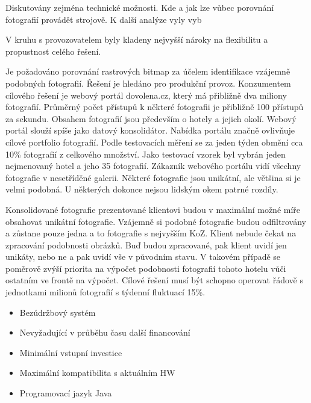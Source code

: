 Diskutovány zejména technické možnosti. Kde a jak lze vůbec porovnání fotografií provádět strojově. K další analýze vyly vyb

V kruhu s provozovatelem byly kladeny nejvyšší nároky na flexibilitu a propustnost celého řešení.


Je požadováno porovnání rastrových bitmap za účelem identifikace vzájemně podobných fotografií. Řešení je hledáno pro produkční provoz. Konzumentem cílového řešení je webový portál dovolena.cz, který má přibližně dva miliony fotografií. Průměrný počet přístupů k některé fotografii je přibližně 100 přístupů za sekundu. Obsahem fotografií jsou především o hotely a jejich okolí. Webový portál slouží spíše jako datový konsolidátor. Nabídka portálu značně ovlivňuje cílové portfolio fotografií. Podle testovacích měření se za jeden týden obmění cca 10\% fotografií z celkového množství. Jako testovací vzorek byl vybrán jeden nejmenovaný hotel a jeho 35 fotografií. Zákazník webového portálu vidí všechny fotografie v nesetříděné galerii. Některé fotografie jsou unikátní, ale většina si je velmi podobná. U některých dokonce nejsou lidským okem patrné rozdíly.

Konsolidované fotografie prezentované klientovi budou v maximální možné míře obsahovat unikátní fotografie. Vzájemně si podobné fotografie budou odfiltrovány a zůstane pouze jedna a to fotografie s nejvyšším KoZ. Klient nebude čekat na zpracování podobnosti obrázků. Buď budou zpracované, pak klient uvidí jen unikáty, nebo ne a pak uvidí vše v původním stavu. V takovém případě se poměrově zvýší priorita na výpočet podobnosti fotografií tohoto hotelu vůči ostatním ve frontě na výpočet. Cílové řešení musí být schopno operovat řádově s jednotkami milionů fotografií s týdenní fluktuací 15\%.

\begin{itemize}
	\setlength{\parskip}{0pt}
	\setlength{\itemsep}{0pt}
	\item {Bezúdržbový systém}
	\item {Nevyžadující v průběhu času další financování}
	\item {Minimální vstupní investice}
	\item {Maximální kompatibilita s aktuálním HW}
	\item {Programovací jazyk Java~\cite{java}}
\end{itemize}

